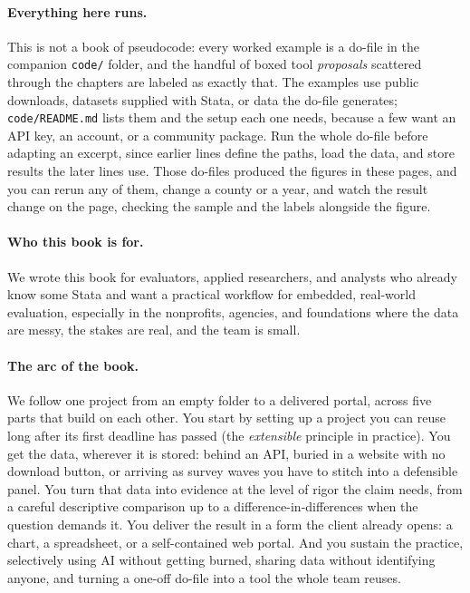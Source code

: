 \documentclass[
    a4paper,
    fontsize=10pt,
    twoside=true,
    numbers=noenddot,
]{kaobook}
\begin{document}
\paragraph{Everything here runs.} This is not a book of pseudocode: every worked example is a do-file in the companion \texttt{code/} folder, and the handful of boxed tool \emph{proposals} scattered through the chapters are labeled as exactly that. The examples use public downloads, datasets supplied with Stata, or data the do-file generates; \texttt{code/README.md} lists them and the setup each one needs, because a few want an API key, an account, or a community package. Run the whole do-file before adapting an excerpt, since earlier lines define the paths, load the data, and store results the later lines use. Those do-files produced the figures in these pages, and you can rerun any of them, change a county or a year, and watch the result change on the page, checking the sample and the labels alongside the figure.

\paragraph{Who this book is for.} We wrote this book for evaluators, applied researchers, and analysts who already know some Stata and want a practical workflow for embedded, real-world evaluation, especially in the nonprofits, agencies, and foundations where the data are messy, the stakes are real, and the team is small.

\paragraph{The arc of the book.} We follow one project from an empty folder to a delivered portal, across five parts that build on each other. You start by setting up a project you can reuse long after its first deadline has passed (the \emph{extensible} principle in practice). You get the data, wherever it is stored: behind an API, buried in a website with no download button, or arriving as survey waves you have to stitch into a defensible panel. You turn that data into evidence at the level of rigor the claim needs, from a careful descriptive comparison up to a difference-in-differences when the question demands it. You deliver the result in a form the client already opens: a chart, a spreadsheet, or a self-contained web portal. And you sustain the practice, selectively using AI without getting burned, sharing data without identifying anyone, and turning a one-off do-file into a tool the whole team reuses.
\end{document}
